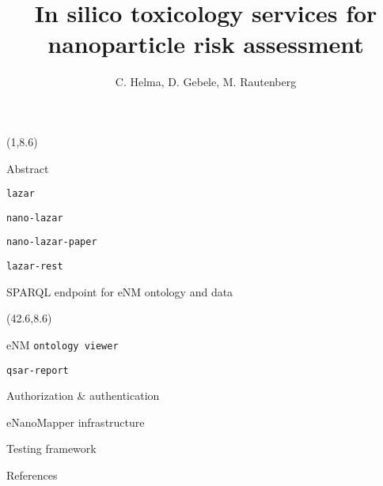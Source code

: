 \documentclass[final]{beamer}
\title{In silico toxicology services for nanoparticle risk assessment}
\author{C. Helma, D. Gebele, M. Rautenberg}
\institute{\emph{in silico} toxicology gmbh, Basel, Switzerland}
\begin{document}
  \begin{frame}{}

    \begin{textblock}{40.5}(1,8.6)
      \begin{block}{Abstract}
        
      \end{block}

      \begin{block}{{\tt lazar}}
        
      \end{block}

      \begin{block}{{\tt nano-lazar}}
        
      \end{block}

      \begin{block}{{\tt nano-lazar-paper}}
        
      \end{block}

      \begin{block}{{\tt lazar-rest}}
        
      \end{block}

      \begin{block}{SPARQL endpoint for eNM ontology and data}
        
      \end{block}

    \end{textblock}

    \begin{textblock}{40.5}(42.6,8.6)

      \begin{block}{eNM {\tt ontology viewer}}
        
      \end{block}

      \begin{block}{{\tt qsar-report}}
        
      \end{block}

      \begin{block}{Authorization \& authentication}
        
      \end{block}

      \begin{block}{eNanoMapper infrastructure}
        
      \end{block}

      \begin{block}{Testing framework}
        
      \end{block}

      \begin{block}{References}
        \small
      \end{block}

    \end{textblock}

  \end{frame}
\end{document}
